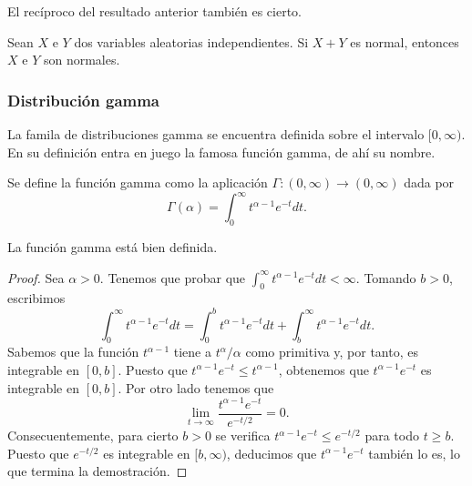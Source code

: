 El recíproco del resultado anterior también es cierto.

\begin{thm}[Cramer]
    Sean $X$ e $Y$ dos variables aleatorias independientes. Si $X+Y$ es normal, entonces $X$ e $Y$ son normales.
\end{thm}

\subsubsection{Distribución gamma}

La famila de distribuciones gamma se encuentra definida sobre el intervalo $[0, \infty)$. En su definición entra en juego la famosa función gamma, de ahí su nombre.

\begin{definition}
    Se define la función gamma como la aplicación $\Gamma: (0, \infty) \to (0, \infty)$ dada por
    \[\Gamma(\alpha) = \int_0^\infty t^{\alpha-1}e^{-t}dt.\]
\end{definition}
\begin{prop}
    La función gamma está bien definida.
\end{prop}
\begin{proof}
    Sea $\alpha > 0$. Tenemos que probar que $\int_0^\infty t^{\alpha-1}e^{-t}dt < \infty$. Tomando $b > 0$, escribimos
    \[\int_0^\infty t^{\alpha-1}e^{-t}dt = \int_0^b t^{\alpha-1}e^{-t}dt + \int_b^\infty t^{\alpha-1}e^{-t}dt.\]
    Sabemos que la función $t^{\alpha - 1}$ tiene a $t^{\alpha} / \alpha$ como primitiva y, por tanto, es integrable en $[0,b]$. Puesto que $t^{\alpha-1}e^{-t} \le t^{\alpha-1}$, obtenemos que $t^{\alpha-1}e^{-t}$ es integrable en $[0,b]$. Por otro lado tenemos que
    \[\lim_{t \to \infty} \frac{t^{\alpha-1}e^{-t}}{e^{-t / 2}} = 0.\]
    Consecuentemente, para cierto $b > 0$ se verifica $t^{\alpha-1}e^{-t} \le e^{-t / 2}$ para todo $t \ge b$. Puesto que $e^{-t / 2}$ es integrable en $[b, \infty)$, deducimos que $t^{\alpha-1}e^{-t}$ también lo es, lo que termina la demostración.
\end{proof}

